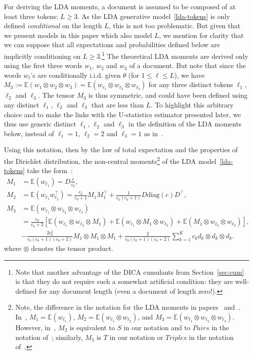 \documentclass{article}
\newcommand{\rbra}[1]{\left(#1\right)}
\newcommand{\sbra}[1]{\left[#1\right]}
\newcommand{\diag}{\mathrm{diag}}
\newcommand{\tp}{\otimes}
\newcommand{\sumk}{\sum_{k=1}^K}
\newcommand{\ebb}{\mathbb{E}}
\begin{document}
For deriving the LDA moments, a document is assumed to be composed of at least three tokens: $L \geq 3$. As the LDA generative model~\eqref{lda-tokens} is only defined \emph{conditional} on the length $L$, this is not too problematic. But given that we present models in this paper which also model $L$, we mention for clarity that we can suppose that all expectations and probabilities defined below are implicitly conditioning on $L \geq 3$.\footnote{Note that another advantage of the DICA cumulants from Section~\ref{sec:cum} is that they do not require such a somewhat artificial condition: they are well-defined for any document length (even a document of length zero!).} The theoretical LDA moments are derived only using the first three words $w_1$, $w_2$ and $w_3$ of a document. But note that since the words $w_{\ell}$'s are conditionally i.i.d. given $\theta$ (for $1 \leq \ell \leq L$), we have $M_3 := \ebb(w_{1}\tp w_{2}\tp w_{3}) = \ebb(w_{\ell_1}\tp w_{\ell_2}\tp w_{\ell_3})$ for any three distinct tokens $\ell_1$, $\ell_2$ and $\ell_3$. The tensor $M_3$ is thus symmetric, and could have been defined using any distinct $\ell_1$, $\ell_2$ and $\ell_3$ that are less than $L$. To highlight this arbitrary choice and to make the links with the U-statistics estimator presented later, we thus use generic distinct $\ell_1$, $\ell_2$ and $\ell_3$ in the definition of the LDA moments below, instead of $\ell_1 = 1$, $\ell_2=2$ and $\ell_3 =1$ as in~\cite{AnaEtAl2012}. 

Using this notation, then by the law of total expectation and the properties of the Dirichlet distribution, the non-central moments\footnote{Note, the difference in the notation for the LDA moments in papers~\cite{AnaEtAl2012} and~\cite{AnaEtAl2014}. In~\cite{AnaEtAl2012}, $M_1=\ebb(w_{\ell_1})$, $M_2=\ebb(w_{\ell_1}\tp w_{\ell_2})$, and $M_3 = \ebb(w_{\ell_1}\tp w_{\ell_2} \tp w_{\ell_3})$. However, in~\cite{AnaEtAl2014},  $M_2$ is equivalent to $S$ in our notation and to $Pairs$ in the notation of~\cite{AnaEtAl2012}; similarly, $M_3$ is $T$ in our notation or $Triples$ in the notation of~\cite{AnaEtAl2012}.}
of the LDA model~\eqref{lda-tokens} take the form~\cite{AnaEtAl2012}:
\begin{align}
\label{appM1} 
M_1 &=\ebb(w_{\ell_1}) = D\frac{c}{c_0},\\
\label{appM2}
M_2 &= \ebb(w_{\ell_1}w_{\ell_2}^{\top})=  \frac{c_0}{c_0+1} M_1  M_1^{\top} + \frac{1}{c_0(c_0+1)}D\diag\rbra{c}D^{\top}, \\
\nonumber
M_3 &=\ebb(w_{\ell_1}\tp w_{\ell_2}\tp w_{\ell_3}) \\ 
\nonumber
&= \frac{c_0}{c_0+2} \sbra{\ebb(w_{\ell_1}\tp w_{\ell_2} \tp M_1) + \ebb(w_{\ell_1} \tp M_1 \tp w_{\ell_3}) + \ebb(M_1\tp w_{\ell_2} \tp w_{\ell_3})}, \\
\label{appM3}
&-\frac{2c_0^3}{c_0(c_0+1)(c_0+2)} M_1\tp M_1 \tp M_1 + \frac{2}{c_0(c_0+1)(c_0+2)}\sumk c_k d_k\tp d_k \tp d_k.
\end{align}
where $\tp$ denotes the tensor product.
\end{document}
